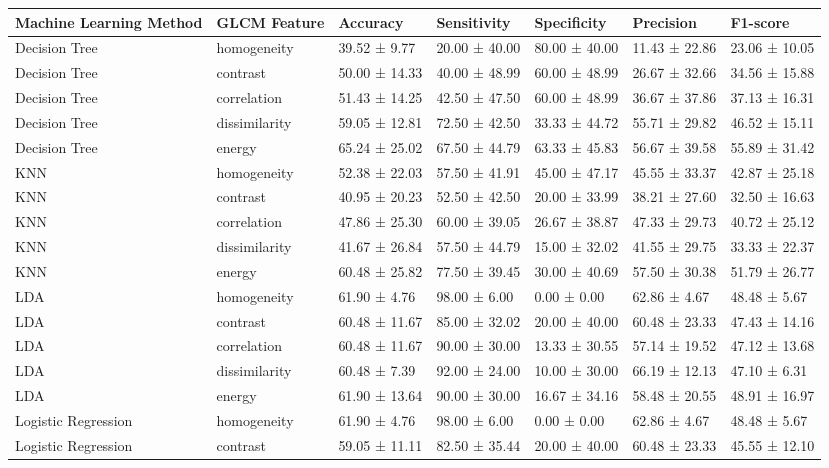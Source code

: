 \begin{tabular}{lllllll}
\toprule
Machine Learning Method & GLCM Feature & Accuracy & Sensitivity & Specificity & Precision & F1-score \\
\midrule
Decision Tree & homogeneity & 39.52 ± 9.77 & 20.00 ± 40.00 & 80.00 ± 40.00 & 11.43 ± 22.86 & 23.06 ± 10.05 \\
Decision Tree & contrast & 50.00 ± 14.33 & 40.00 ± 48.99 & 60.00 ± 48.99 & 26.67 ± 32.66 & 34.56 ± 15.88 \\
Decision Tree & correlation & 51.43 ± 14.25 & 42.50 ± 47.50 & 60.00 ± 48.99 & 36.67 ± 37.86 & 37.13 ± 16.31 \\
Decision Tree & dissimilarity & 59.05 ± 12.81 & 72.50 ± 42.50 & 33.33 ± 44.72 & 55.71 ± 29.82 & 46.52 ± 15.11 \\
Decision Tree & energy & 65.24 ± 25.02 & 67.50 ± 44.79 & 63.33 ± 45.83 & 56.67 ± 39.58 & 55.89 ± 31.42 \\
KNN & homogeneity & 52.38 ± 22.03 & 57.50 ± 41.91 & 45.00 ± 47.17 & 45.55 ± 33.37 & 42.87 ± 25.18 \\
KNN & contrast & 40.95 ± 20.23 & 52.50 ± 42.50 & 20.00 ± 33.99 & 38.21 ± 27.60 & 32.50 ± 16.63 \\
KNN & correlation & 47.86 ± 25.30 & 60.00 ± 39.05 & 26.67 ± 38.87 & 47.33 ± 29.73 & 40.72 ± 25.12 \\
KNN & dissimilarity & 41.67 ± 26.84 & 57.50 ± 44.79 & 15.00 ± 32.02 & 41.55 ± 29.75 & 33.33 ± 22.37 \\
KNN & energy & 60.48 ± 25.82 & 77.50 ± 39.45 & 30.00 ± 40.69 & 57.50 ± 30.38 & 51.79 ± 26.77 \\
LDA & homogeneity & 61.90 ± 4.76 & 98.00 ± 6.00 & 0.00 ± 0.00 & 62.86 ± 4.67 & 48.48 ± 5.67 \\
LDA & contrast & 60.48 ± 11.67 & 85.00 ± 32.02 & 20.00 ± 40.00 & 60.48 ± 23.33 & 47.43 ± 14.16 \\
LDA & correlation & 60.48 ± 11.67 & 90.00 ± 30.00 & 13.33 ± 30.55 & 57.14 ± 19.52 & 47.12 ± 13.68 \\
LDA & dissimilarity & 60.48 ± 7.39 & 92.00 ± 24.00 & 10.00 ± 30.00 & 66.19 ± 12.13 & 47.10 ± 6.31 \\
LDA & energy & 61.90 ± 13.64 & 90.00 ± 30.00 & 16.67 ± 34.16 & 58.48 ± 20.55 & 48.91 ± 16.97 \\
Logistic Regression & homogeneity & 61.90 ± 4.76 & 98.00 ± 6.00 & 0.00 ± 0.00 & 62.86 ± 4.67 & 48.48 ± 5.67 \\
Logistic Regression & contrast & 59.05 ± 11.11 & 82.50 ± 35.44 & 20.00 ± 40.00 & 60.48 ± 23.33 & 45.55 ± 12.10 \\

\end{tabular}
